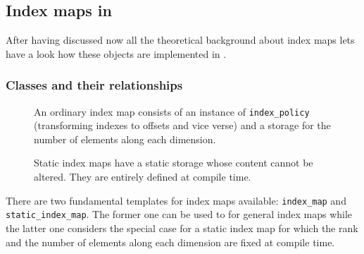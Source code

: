 \subsection{Index maps in \libpnicore}

After having discussed now all the theoretical background about index maps lets
have a look how these objects are implemented in \libpnicore.

\subsubsection{Classes and their relationships}

\begin{figure}[tb]
\centering
\begin{minipage}[c]{0.49\linewidth}
\centering
{}
\caption{{\small\label{fig:array_app:index_map_diagram}
An ordinary index map consists of an instance of {\tt index\_policy}
(transforming indexes to offsets and vice verse) and a
storage for the number of elements along each dimension. 
}}
\end{minipage}
\hfill
\begin{minipage}[c]{0.49\linewidth}
\centering
{}
\caption{{\small\label{fig:array_app:static_index_map_diagram}
Static index maps have a static storage whose content cannot be altered. They
are entirely defined at compile time.
}}
\end{minipage}
\end{figure}
There are two fundamental templates for index maps available: {\tt index\_map}
and {\tt static\_index\_map}. The former one can be used to for general index
maps while the latter one considers the special case for a static index map
for which the rank and the number of elements along each dimension are fixed at
compile time. 

